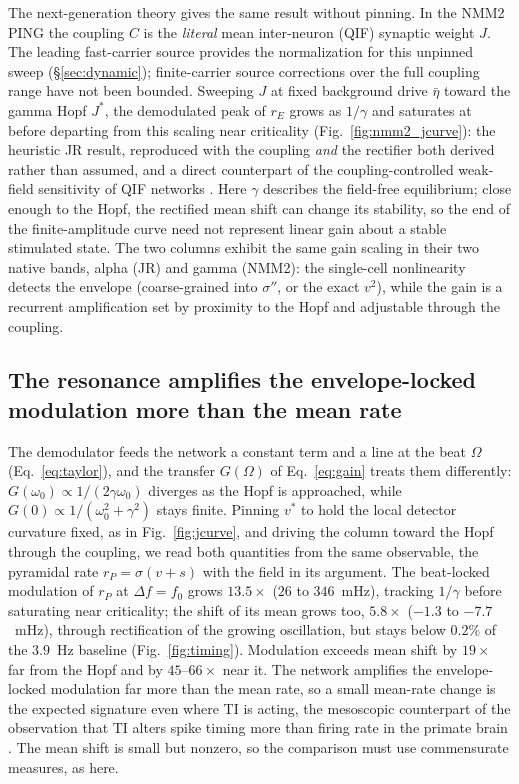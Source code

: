 \documentclass[11pt,a4paper]{article}
\newcommand{\Sig}{\sigma}
\providecommand{\DIFaddtex}[1]{{\protect\color{blue} \sf #1}} %
\providecommand{\DIFdeltex}[1]{{\protect\color{red} \scriptsize #1}} %
\providecommand{\DIFaddbegin}{} %
\providecommand{\DIFaddend}{} %
\providecommand{\DIFdelbegin}{} %
\providecommand{\DIFdelend}{} %
\providecommand{\DIFadd}[1]{\texorpdfstring{\DIFaddtex{#1}}{#1}} %
\providecommand{\DIFdel}[1]{\texorpdfstring{\DIFdeltex{#1}}{}} %
\begin{document}
The next-generation theory gives the same result without pinning. In the NMM2 PING the
coupling $C$ is the \emph{literal} mean inter-neuron (QIF) synaptic weight $J$.
The leading fast-carrier source provides the normalization for this unpinned
sweep (\S\ref{sec:dynamic}); finite-carrier source corrections over the full
coupling range have not been bounded. Sweeping $J$ at fixed background drive
$\bar\eta$ toward the gamma Hopf $J^*$, the demodulated peak of $r_E$ grows as
$1/\gamma$ \DIFdelbegin \DIFdel{and saturates at }\DIFdelend \DIFaddbegin \DIFadd{before departing from this scaling near }\DIFaddend criticality
(Fig.~\ref{fig:nmm2_jcurve}): the heuristic JR
result, reproduced with the coupling \emph{and} the rectifier both derived rather than
assumed, and a direct counterpart of the coupling-controlled weak-field sensitivity of
QIF networks \cite{clusella2023}. \DIFaddbegin \DIFadd{Here $\gamma$ describes the field-free equilibrium;
close enough to the Hopf, the rectified mean shift can change its stability, so the
end of the finite-amplitude curve need not represent linear gain about a stable
stimulated state. }\DIFaddend The two columns exhibit the same gain scaling in
their two native bands, alpha (JR) and gamma (NMM2): the single-cell nonlinearity
detects the envelope (coarse-grained into $\Sig''$, or the exact $v^2$), while the
gain is a recurrent amplification set by proximity to the
Hopf and adjustable through the coupling.

\subsection{The resonance amplifies the envelope-locked modulation more than the mean rate}\label{sec:timing}
The demodulator feeds the network a constant term and a line at the beat $\Omega$
(Eq.~\eqref{eq:taylor}), and the transfer $G(\Omega)$ of Eq.~\eqref{eq:gain} treats them
differently: $G(\omega_0)\propto1/(2\gamma\omega_0)$ diverges as the Hopf is approached,
while $G(0)\propto1/(\omega_0^2+\gamma^2)$ stays finite. Pinning $v^*$ to hold the local detector
curvature fixed, as in Fig.~\ref{fig:jcurve}, and driving the column toward the Hopf
through the coupling, we read both quantities from the same observable, the pyramidal
rate $r_P=\Sig(v+s)$ with the field in its argument. The beat-locked modulation of $r_P$ at
$\Delta f=f_0$ grows $13.5\times$ ($26$ to $346$~mHz), tracking $1/\gamma$ before
saturating near criticality; the shift of its mean grows too, $5.8\times$ ($-1.3$ to
$-7.7$~mHz), through rectification of the growing oscillation, but stays below $0.2\%$ of
the $3.9$~Hz baseline (Fig.~\ref{fig:timing}). Modulation exceeds mean shift by $19\times$
far from the Hopf and by $45$--$66\times$ near it. The network amplifies the
envelope-locked modulation far more than the mean rate, so a small mean-rate change is
the expected signature even where TI is acting, the mesoscopic counterpart of the
observation that TI alters spike timing more than firing rate in the primate brain
\cite{vieira2024}. The mean shift is small but nonzero, so the comparison must use
commensurate measures, as here.
\end{document}
